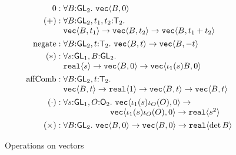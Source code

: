 \begin{figure}[t]
  \centering
  \begin{align*}
    0 & : \forall B \mathord: \SynGL{2}.\ \tyPrim{vec}{B,0} \\
    (+) & :
    \begin{array}[t]{@{}l}
      \forall B \mathord: \SynGL{2}, t_1,t_2 \mathord: \SynTransl{2}. \\
      \tyPrim{vec}{B,t_1} \to \tyPrim{vec}{B,t_2} \to
      \tyPrim{vec}{B,t_1 + t_2}
    \end{array}
    \\
    \mathrm{negate} & : \forall B \mathord: \SynGL{2}, t \mathord: \SynTransl{2}.\ \tyPrim{vec}{B,t} \to \tyPrim{vec}{B,-t} \\
  (*) & : 
  \begin{array}[t]{@{}l}
    \forall s \mathord: \SynGL{1}, B \mathord:\SynGL{2}.\ \\
    \tyPrim{real}{s} \to \tyPrim{vec}{B,0} \to \tyPrim{vec}{\iota_1(s)B,0}
  \end{array}\\
    \mathrm{affComb} &:
    \begin{array}[t]{@{}l}\forall B \mathord: \SynGL{2}, t \mathord:
    \SynTransl{2}.\\ \tyPrim{vec}{B,t} \to \tyPrim{real}{1} \to
    \tyPrim{vec}{B,t} \to \tyPrim{vec}{B,t}
    \end{array} \\
    (\cdot) & :
\begin{array}[t]{@{}l}
    \forall s \mathord: \SynGL{1}, O \mathord: \SynOrth{2}.\ \tyPrim{vec}{\iota_1(s)\iota_O(O),0} \to\\
    \hspace{2cm}\tyPrim{vec}{\iota_1(s)\iota_O(O),0}\to \tyPrim{real}{s^2}
\end{array}\\
  (\times) & : \forall B \mathord: \SynGL{2}.\ \tyPrim{vec}{B,0} \to
  \tyPrim{vec}{B,0} \to \tyPrim{real}{\det B} 
\end{align*}
  \caption{Operations on vectors}
  \label{fig:vec-ops}
\end{figure}



